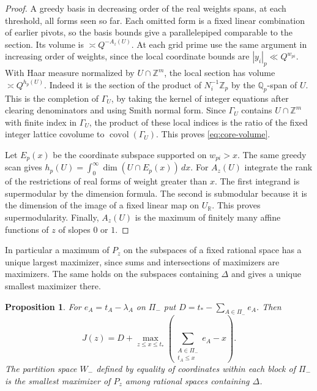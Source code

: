 \documentclass[11pt,reqno,a4paper]{amsart}
\newtheorem{proposition}[theorem]{Proposition}
\theoremstyle{remark}
\numberwithin{equation}{section}
\begin{document}
\begin{proof}
A greedy basis in decreasing order of the real weights spans, at each
threshold, all forms seen so far. Each omitted form is a fixed linear
combination of earlier pivots, so the basis bounds give a
parallelepiped comparable to the section. Its volume is
$\asymp Q^{-A_z(U)}$. At each grid prime use the same argument in
increasing order of weights, since the local coordinate bounds are
$|y_i|_p\ll Q^{w_{pi}}$. With Haar measure normalized by
$U\cap\mathbb Z^m$, the local section has volume
$\asymp Q^{h_p(U)}$. Indeed it is the section of the product of
$N_i^{-1}\mathbb Z_p$ by the $\mathbb Q_p$-span of $U$. This is the
completion of $\Gamma_U$, by taking the kernel of integer equations
after clearing denominators and using Smith normal form. Since
$\Gamma_U$ contains $U\cap\mathbb Z^m$ with finite index in
$\Gamma_U$, the product of these local indices is the ratio of the
fixed integer lattice covolume to $\operatorname{covol}(\Gamma_U)$.
This proves \eqref{eq:core-volume}.

Let $E_p(x)$ be the coordinate subspace supported on $w_{pi}>x$.
The same greedy scan gives
$h_p(U)=\int_0^\infty\dim(U\cap E_p(x))\,dx$. For $A_z(U)$ integrate
the rank of the restrictions of real forms of weight greater than $x$.
The first integrand is supermodular by the dimension formula. The
second is submodular because it is the dimension of the image of a
fixed linear map on $U_{\mathbb R}$. This proves supermodularity.
Finally, $A_z(U)$ is the maximum of finitely many affine functions
of $z$ of slopes $0$ or $1$.
\end{proof}

In particular a maximum of $P_z$ on the subspaces of a fixed rational
space has a unique largest maximizer, since sums and intersections
of maximizers are maximizers. The same holds on the subspaces
containing $\Delta$ and gives a unique smallest maximizer there.

\begin{proposition}\label{prop:section-optimization}
For $e_A=t_A-\lambda_A$ on $\Pi_-$ put
$D=t_*-\sum_{A\in\Pi_-}e_A$. Then
\begin{equation}\label{eq:core-spectrum}
 J(z)=D+\max_{z\le x\le t_*}
              \left(\sum_{\substack{A\in\Pi_-\\t_A\le x}}e_A-x\right).
\end{equation}
The partition space $W_-$ defined by equality of coordinates within
each block of $\Pi_-$ is the smallest maximizer of $P_z$ among
rational spaces containing $\Delta$.
\end{proposition}
\end{document}
